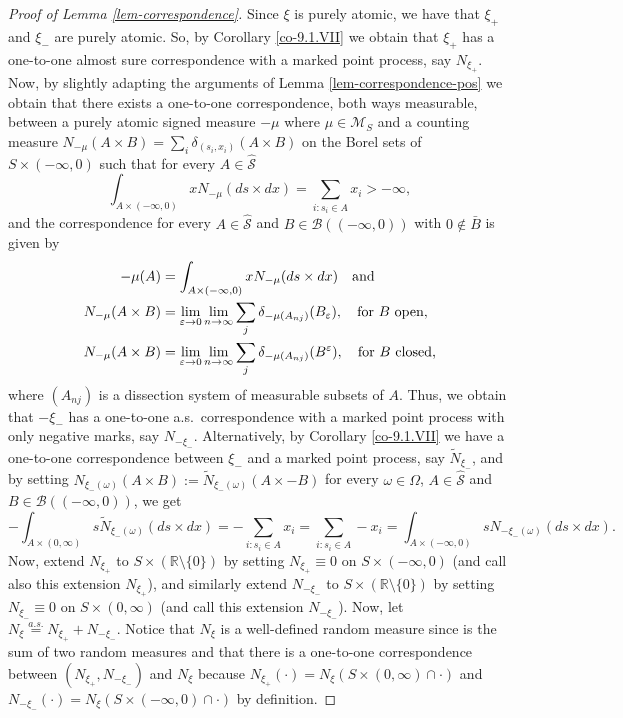 \documentclass{article}
\theoremstyle{plain}
\theoremstyle{remark}
\begin{document}
\begin{proof}[Proof of Lemma \ref{lem-correspondence}]
	Since $\xi$ is purely atomic, we have that $\xi_+$ and $\xi_-$ are purely atomic. So, by Corollary \ref{co-9.1.VII} we obtain that $\xi_+$ has a one-to-one almost sure correspondence with a marked point process, say $N_{\xi_+}$. Now, by slightly adapting the arguments of Lemma \ref{lem-correspondence-pos} we obtain that there exists a one-to-one correspondence, both ways measurable, between a purely atomic signed measure $-\mu$ where $\mu\in\mathcal{M}_S$ and  a counting measure $N_{-\mu}(A\times B)=\sum_{i}\delta_{(s_i,x_i)}(A\times B)$ on the Borel sets of $S\times (-\infty,0)$ such that for every $A\in\hat{\mathcal{S}}$
	\begin{equation*}
		\int_{A\times (-\infty,0)}x N_{-\mu}(ds\times dx)=\sum_{i:s_i\in A}x_i>-\infty,
	\end{equation*}
	and the correspondence for every $A\in\hat{\mathcal{S}}$ and $B\in \mathcal{B} ((-\infty,0))$ with $0\notin\bar{B}$ is given by 
	\begin{align*}
		-\mu(A)&=	\int_{A\times (-\infty,0)} xN_{-\mu}(ds\times dx)\quad\textnormal{and}\\
		N_{-\mu}(A\times B)&=\lim\limits_{\varepsilon\to 0}\lim\limits_{n\to\infty}\sum_{j}\delta_{-\mu(A_{nj})}(B_{\varepsilon}),\quad\text{for $B$ open,}\\
		N_{-\mu}(A\times B)&=\lim\limits_{\varepsilon\to 0}\lim\limits_{n\to\infty}\sum_{j}\delta_{-\mu(A_{nj})}(B^{\varepsilon}),\quad\text{for $B$ closed,}
	\end{align*}
	where $(A_{nj})$ is a dissection system of measurable subsets of $A$. Thus, we obtain that $-\xi_-$ has a one-to-one a.s.~correspondence with a marked point process with only negative marks, say $N_{-\xi_-}$. Alternatively, by Corollary \ref{co-9.1.VII} we have a one-to-one correspondence between $\xi_-$ and a marked point process, say $\tilde{N}_{\xi_-}$, and by setting $N_{\xi_-(\omega)}(A\times B):=\tilde{N}_{\xi_-(\omega)}(A\times -B)$  for every $\omega\in\Omega$, $A\in\hat{\mathcal{S}}$ and $B\in \mathcal{B} ((-\infty,0))$, we get
	\begin{equation*}
		-\int_{A\times(0,\infty)} s\tilde{N}_{\xi_-(\omega)}(ds\times dx)=-\sum_{i:s_i\in A}x_i		=\sum_{i:s_i\in A}-x_i=\int_{A\times (-\infty,0)} sN_{-\xi_-(\omega)}(ds\times dx).
	\end{equation*}
	Now, extend $N_{\xi_+}$ to $S\times (\mathbb{R}\setminus\{0\})$ by setting $N_{\xi_+}\equiv0$ on $S\times(-\infty,0)$ (and call also this extension $N_{\xi_+}$), and similarly extend $N_{-\xi_-}$ to $S\times (\mathbb{R}\setminus\{0\})$ by setting $N_{\xi_-}\equiv0$ on $S\times(0,\infty)$ (and call this extension $N_{-\xi_-}$). Now, let $N_\xi\stackrel{a.s.}{=}N_{\xi_+}+N_{-\xi_-}$. Notice that $N_\xi$ is a well-defined random measure since is the sum of two random measures and that there is a one-to-one correspondence between $(N_{\xi_+},N_{-\xi_-})$ and $N_{\xi}$ because $N_{\xi_+}(\cdot)=N_{\xi}(S\times(0,\infty)\cap \cdot)$ and $N_{-\xi_-}(\cdot)=N_{\xi}(S\times(-\infty,0)\cap \cdot)$ by definition. 
	

\end{proof}
\end{document}
